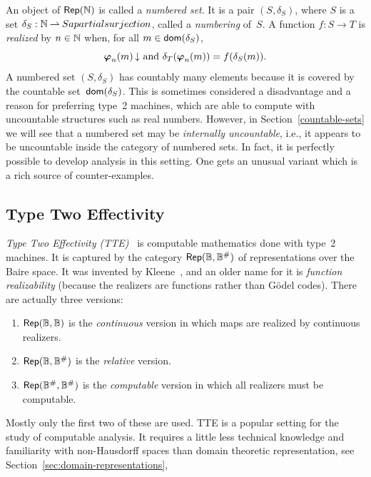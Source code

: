 An object of $\mathsf{Rep}(\mathbb{N})$ is called a \emph{numbered set}. It is a pair
$(S, \delta_S)$, where $S$ is a set $\delta_S : \mathbb{N} \mathbin{\rightharpoonup} S a partial
surjection$, called a \emph{numbering} of~$S$. A function $f : S \to
T$ is \emph{realized} by $n \in \mathbb{N}$ when, for all $m \in
\mathsf{dom}(\delta_S)$,
%
\begin{equation*}
  \text{$\text{\boldmath{$\varphi$}}_{n}(m)\,{\downarrow}$ and $\delta_T(\text{\boldmath{$\varphi$}}_{n}(m)) = f(\delta_S(m))$.}
\end{equation*}
%
A numbered set $(S, \delta_S)$ has countably many elements because it
is covered by the countable set~$\mathsf{dom}(\delta_S)$. This is sometimes
considered a disadvantage and a reason for preferring type~2 machines,
which are able to compute with uncountable structures such as real
numbers. However, in Section~\ref{countable-sets} we will see that a
numbered set may be \emph{internally uncountable}, i.e., it appears to
be uncountable inside the category of numbered sets. In fact, it is
perfectly possible to develop analysis in this setting. One gets an
unusual variant which is a rich source of counter-examples.


\subsection{Type Two Effectivity}
\label{sec:tte}

\emph{Type Two Effectivity (TTE)}~\cite{Wei00} is computable
mathematics done with type~2 machines. It is captured by the category
$\mathsf{Rep}(\mathbb{B}, \mathbb{B}^{\#})$ of representations over the Baire space.
It was invented by Kleene~\cite{KV65}, and an older name for it is
\emph{function realizability} (because the realizers are functions
rather than G\"odel codes). There are actually three versions:
%
\begin{enumerate}
\item $\mathsf{Rep}(\mathbb{B}, \mathbb{B})$ is the \emph{continuous} version in which
  maps are realized by continuous realizers.
\item $\mathsf{Rep}(\mathbb{B}, \mathbb{B}^{\#})$ is the \emph{relative} version.
\item $\mathsf{Rep}(\mathbb{B}^{\#}, \mathbb{B}^{\#})$ is the \emph{computable}
  version in which all realizers must be computable.
\end{enumerate}
%
Mostly only the first two of these are used. TTE is a popular setting
for the study of computable analysis. It requires a little less
technical knowledge and familiarity with non-Hausdorff spaces than
domain theoretic representation, see
Section~\ref{sec:domain-representations},


